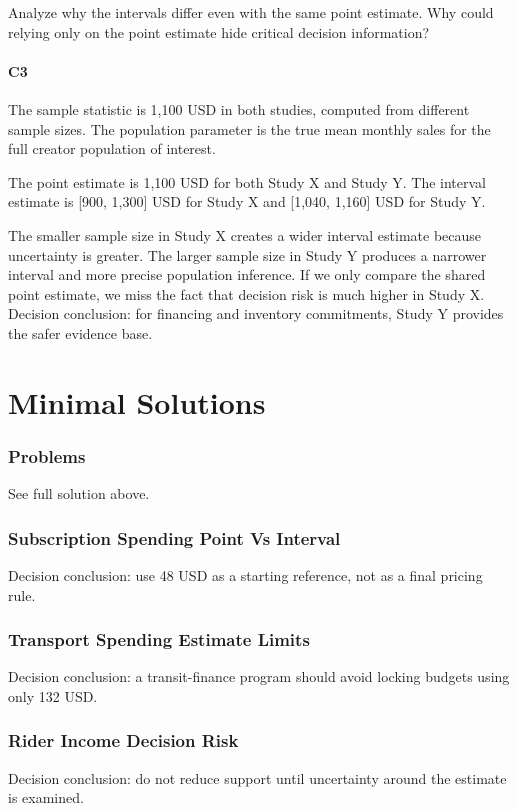 \begin{ExamProblems}
		Analyze why the intervals differ even with the same point estimate.
		Why could relying only on the point estimate hide critical decision information?

		\subsection*{C3}
		The sample statistic is 1,100 USD in both studies, computed from different sample sizes.
		The population parameter is the true mean monthly sales for the full creator population of interest.

		The point estimate is 1,100 USD for both Study X and Study Y.
		The interval estimate is [900, 1,300] USD for Study X and [1,040, 1,160] USD for Study Y.

		The smaller sample size in Study X creates a wider interval estimate because uncertainty is greater.
		The larger sample size in Study Y produces a narrower interval and more precise population inference.
		If we only compare the shared point estimate, we miss the fact that decision risk is much higher in Study X.
		Decision conclusion: for financing and inventory commitments, Study Y provides the safer evidence base.

	\end{ExamProblems}


\part{Minimal Solutions}

\section*{Problems}
See full solution above.

\section*{Subscription Spending Point Vs Interval}
Decision conclusion: use 48 USD as a starting reference, not as a final pricing rule.

\section*{Transport Spending Estimate Limits}
Decision conclusion: a transit-finance program should avoid locking budgets using only 132 USD.

\section*{Rider Income Decision Risk}
Decision conclusion: do not reduce support until uncertainty around the estimate is examined.

